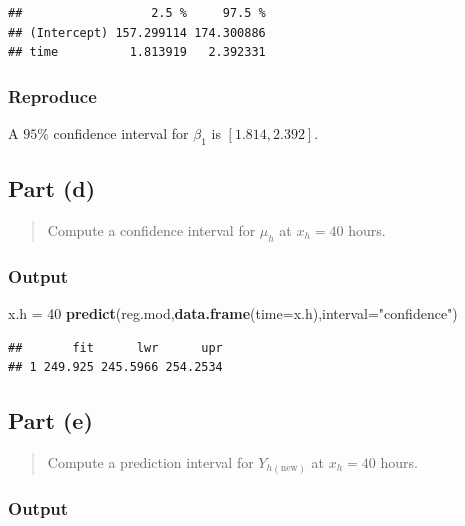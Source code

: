 \documentclass[
]{article}
\newenvironment{Shaded}{\begin{snugshade}}{\end{snugshade}}
\newcommand{\AttributeTok}[1]{\textcolor[rgb]{0.13,0.29,0.53}{#1}}
\newcommand{\DecValTok}[1]{\textcolor[rgb]{0.00,0.00,0.81}{#1}}
\newcommand{\FunctionTok}[1]{\textcolor[rgb]{0.13,0.29,0.53}{\textbf{#1}}}
\newcommand{\NormalTok}[1]{#1}
\newcommand{\OtherTok}[1]{\textcolor[rgb]{0.56,0.35,0.01}{#1}}
\newcommand{\StringTok}[1]{\textcolor[rgb]{0.31,0.60,0.02}{#1}}
\begin{document}
\begin{verbatim}
##                  2.5 %     97.5 %
## (Intercept) 157.299114 174.300886
## time          1.813919   2.392331
\end{verbatim}

\hypertarget{reproduce-2}{%
\subsubsection{Reproduce}\label{reproduce-2}}

A \(95\%\) confidence interval for \(\beta_1\) is \([1.814,2.392]\).

\hypertarget{part-d}{%
\subsection{Part (d)}\label{part-d}}

\begin{quote}
Compute a confidence interval for \(\mu_h\) at \(x_h = 40\) hours.
\end{quote}

\hypertarget{output-1}{%
\subsubsection{Output}\label{output-1}}

\begin{Shaded}
\begin{Highlighting}[]
\NormalTok{x.h }\OtherTok{=} \DecValTok{40}
\FunctionTok{predict}\NormalTok{(reg.mod,}\FunctionTok{data.frame}\NormalTok{(}\AttributeTok{time=}\NormalTok{x.h),}\AttributeTok{interval=}\StringTok{"confidence"}\NormalTok{)}
\end{Highlighting}
\end{Shaded}

\begin{verbatim}
##       fit      lwr      upr
## 1 249.925 245.5966 254.2534
\end{verbatim}

\hypertarget{part-e}{%
\subsection{Part (e)}\label{part-e}}

\begin{quote}
Compute a prediction interval for \(Y_{h(\text{new})}\) at \(x_h = 40\)
hours.
\end{quote}

\hypertarget{output-2}{%
\subsubsection{Output}\label{output-2}}
\end{document}
